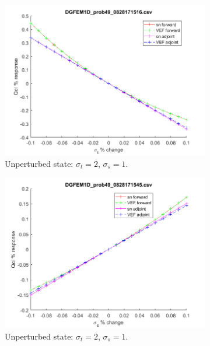 \documentclass[12pt]{report}
\newcommand{\sigt}{\sigma_t}
\newcommand{\sigs}{\sigma_s}
\begin{document}
\begin{figure}[H]
\label{Streaming}
\centering
\begin{subfigure}{.5\textwidth}
  \centering
  \includegraphics[width=.98\linewidth]{figures/49sigtSens.png}
  \caption{Unperturbed state: $\sigt=2$, $\sigs=1$.}
  \label{fig:sfig1}
\end{subfigure}%
\begin{subfigure}{.5\textwidth}
  \centering
  \includegraphics[width=.98\linewidth]{figures/49sigsSens.png}
  \caption{Unperturbed state: $\sigt=2$, $\sigs=1$.}
  \label{fig:sfig4}
\end{subfigure}%
\\
\begin{subfigure}{.5\textwidth}
  \centering

\end{subfigure}
\end{figure}
\end{document}
